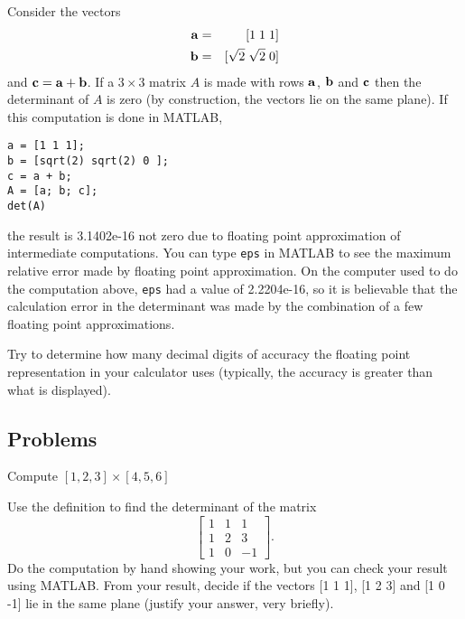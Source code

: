 \begin{example} Consider the vectors 
\begin{eqnarray*}
{\bf a} & = & [1 \; 1 \; 1] \\
{\bf b} & = & [\sqrt{2} \; \sqrt{2} \; 0]
\end{eqnarray*}
and ${\bf c} = {\bf a} + {\bf b}$. 
If a $3 \times 3$ matrix $A$  is made with rows ${\bf a}$, ${\bf b}$ and ${\bf c}$ then 
the determinant of $A$ is zero (by construction, the vectors lie on the same plane). 
If this computation is done in MATLAB, 
\begin{verbatim}
a = [1 1 1];
b = [sqrt(2) sqrt(2) 0 ];
c = a + b;
A = [a; b; c];
det(A)
\end{verbatim}
the result is 3.1402e-16 not zero due to floating point approximation of intermediate 
computations. You can type {\tt eps} in MATLAB to see the maximum 
relative error made by 
floating point approximation. On the computer used to do the computation above, 
{\tt eps} had a value of 2.2204e-16, so it is believable that the calculation error in 
the determinant was made by the combination of a few floating point   approximations.
\end{example} 

Try to determine how many decimal digits of accuracy the floating point representation 
in your calculator uses (typically, the accuracy is greater than what is displayed). 

\subsection{Problems}

\begin{problem}
\label{op1_12}
Compute $[1,2,3]\times[4,5,6]$
\end{problem}

\begin{problem}
\label{2009_a2_1}
Use the definition to find the determinant of the matrix
\[
\left[ \begin{array}{ccc}
1 & 1 & 1 \\
1 & 2 & 3 \\
1 & 0 & -1
       \end{array} \right].
\]
Do the computation by hand showing your work, but you can check
your result using MATLAB.
From your result, decide if the vectors [1 1 1], [1 2 3] and [1 0 -1]
lie in the same plane (justify your answer, very briefly).
\end{problem}

